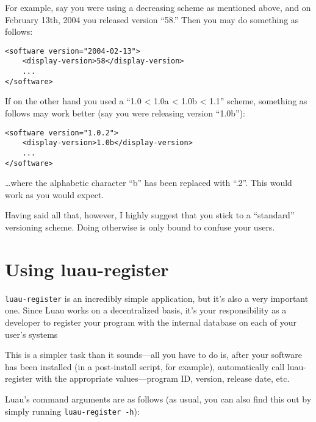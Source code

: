 \documentclass{report}
\begin{document}
For example, say you were using a decreasing scheme as mentioned above, and on February 13th, 2004 you released version ``58.''  Then you may do something as follows:

\begin{verbatim}
<software version="2004-02-13">
	<display-version>58</display-version>
	...
</software>
\end{verbatim}

If on the other hand you used a ``1.0 < 1.0a < 1.0b < 1.1'' scheme, something as follows may work better (say you were releasing version ``1.0b''):

\begin{verbatim}
<software version="1.0.2">
	<display-version>1.0b</display-version>
	...
</software>
\end{verbatim}

\ldots where the alphabetic character ``b'' has been replaced with ``.2''.  This would work as you would expect.

Having said all that, however, I highly suggest that you stick to a ``standard'' versioning scheme.  Doing otherwise is only bound to confuse your users.

\section{Using luau-register}
\label{sec:luau-register}

\texttt{luau-register} is an incredibly simple application, but it's also a very important one.  Since Luau works on a decentralized basis, it's your responsibility as a developer to register your program with the internal database on each of your user's systems

This is a simpler task than it sounds---all you have to do is, after your software has been installed (in a post-install script, for example), automatically call luau-register with the appropriate values---program ID, version, release date, etc.

Luau's command arguments are as follows (as usual, you can also find this out by simply running \texttt{luau-register -h}):
\end{document}
